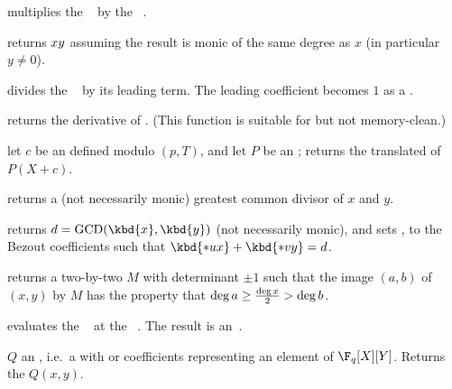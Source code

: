  multiplies the
~ by the ~.

returns $x\*y$ assuming the result is monic of the same degree as $x$ (in
particular $y\neq 0$).


 divides the ~
by its leading term. The leading coefficient becomes $1$ as a .







 returns the derivative of .
(This function is suitable for  but not memory-clean.)

 let $c$ be an 
defined modulo $(p, T)$, and let $P$ be an ; returns the translated
 of $P(X+c)$.

 returns a (not necessarily
monic) greatest common divisor of $x$  and $y$.

returns $d = \text{GCD}(\kbd{x},\kbd{y})$ (not necessarily monic), and sets
,  to the Bezout coefficients such that $\kbd{*ux} +
\kbd{*vy} = d$.

 returns a two-by-two
 $M$ with determinant $\pm 1$ such that the image $(a,b)$ of $(x,y)$
by $M$ has the property that $\deg a \geq {\deg x \over 2} > \deg b$.

 evaluates the ~
at the ~. The result is an~.

 $Q$ an ,
i.e.~a  with  or  coefficients representing an
element of $\F_q[X][Y]$. Returns the  $Q(x,y)$.

